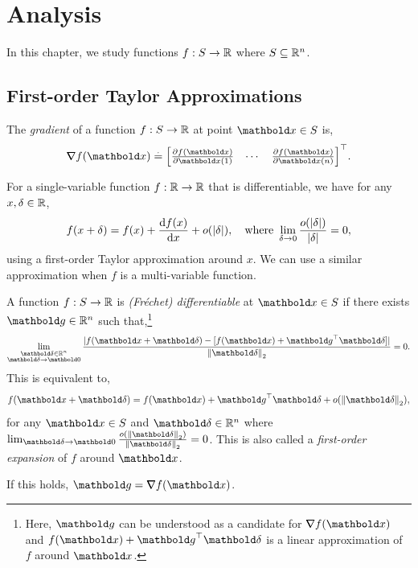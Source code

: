 
\chapter{Analysis}

In this chapter, we study functions $f: S \to \mathbb{R}$ where $S \subseteq \mathbb{R}^n$.

\section{First-order Taylor Approximations}

\begin{defn}[Gradient] The \emph{gradient} of a function $f: S \to \mathbb{R}$ at point $\vx \in \sS$ is, \begin{align}
    \grad f(\vx) \defeq \trans{\begin{bmatrix}
        \pdv{f(\vx)}{\vx(1)} & \cdots & \pdv{f(\vx)}{\vx(n)}
    \end{bmatrix}}.
\end{align}
\end{defn}

For a single-variable function $f: \mathbb{R} \to \mathbb{R}$ that is differentiable, we have for any $x, \delta \in \mathbb{R}$, \begin{align*}
    f(x + \delta) = f(x) + \odv{f(x)}{x} + o(|\delta|), \quad \text{where } \lim_{\delta \to 0} \frac{o(|\delta|)}{|\delta|} = 0,
\end{align*} using a first-order Taylor approximation around $x$. We can use a similar approximation when $f$ is a multi-variable function.

\begin{defn} A function $f: S \to \mathbb{R}$ is \emph{(Fréchet) differentiable} at $\vx \in \sS$ if there exists $\vg \in \R^n$ such that,\footnote{Here, $\vg$ can be understood as a candidate for $\grad f(\vx)$ and $f(\vx) + \trans{\vg}\vdelta$ is a linear approximation of $f$ around $\vx$.} \begin{align}
    \lim_{\substack{\vdelta \in \R^n \\ \vdelta \to \vZero}} \frac{|f(\vx + \vdelta) - [f(\vx) + \trans{\vg}\vdelta]|}{\norm{\vdelta}_2} = 0.
\end{align} This is equivalent to, \begin{align}
    f(\vx + \vdelta) = f(\vx) + \trans{\vg}\vdelta + o(\norm{\vdelta}_2),
\end{align} for any $\vx \in \sS$ and $\vdelta \in \R^n$ where $\lim_{\vdelta \to \vZero} \frac{o(\norm{\vdelta}_2)}{\norm{\vdelta}_2} = 0$. This is also called a \emph{first-order expansion} of $f$ around $\vx$.
\end{defn}
\begin{rmk}
If this holds, $\vg = \grad f(\vx)$.
\end{rmk}

